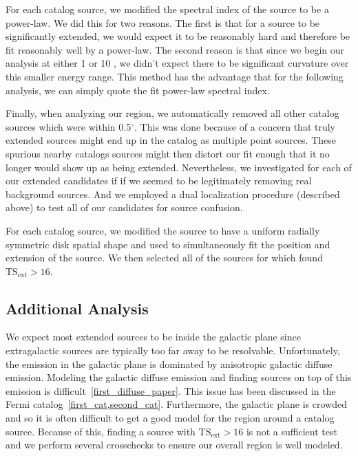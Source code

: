 \documentclass[12pt,preprint]{aastex}
\newcommand{\gev}{\text{GeV}\xspace}
\newcommand{\tsext}{{\ensuremath{\text{TS}_\text{ext}}}\xspace}
\renewcommand{\deg}{\ensuremath{^\circ}\xspace}
\newcommand{\pointlike}{\text{\em pointlike}\xspace}
\begin{document}
For each catalog source, we modified the spectral index of the source
to be a power-law. We did this for two reasons. The first is that for a
source to be significantly extended, we would expect it to be reasonably
hard and therefore be fit reasonably well by a power-law.  The second reason
is that since we begin our analysis at either 1 \gev or 10 \gev, we didn't
expect there to be significant curvature over this smaller energy range.
This method has the advantage that for the following analysis, we can
simply quote the fit power-law spectral index.

Finally, when analyzing our region, we automatically removed all other
catalog sources which were within 0.5\deg. This was done because of
a concern that truly extended sources might end up in the catalog as
multiple point sources. These spurious nearby catalogs sources might then
distort our fit enough that it no longer would show up as being extended.
Nevertheless, we investigated for each of our extended candidates if
if we seemed to be legitimately removing real background sources. And
we employed a dual localization procedure (described above) to test
all of our candidates for source confusion.

For each catalog source, we modified the source to have a uniform radially
symmetric disk spatial shape and used \pointlike to simultaneously fit
the position and extension of the source.  We then selected all of the
sources for which \pointlike found $\tsext>16$.

\subsection{Additional Analysis}

We expect most extended sources to be inside the galactic plane
since extragalactic sources are typically too far away to be
resolvable. Unfortunately, the \gev emission in the galactic plane
is dominated by anisotropic galactic diffuse emission.  Modeling the
galactic diffuse emission and finding sources on top of this emission is
difficult~\ref{first_diffuse_paper}. This issue has been discussed in the
Fermi catalog~\ref{first_cat,second_cat}. Furthermore, the galactic plane is
crowded and so it is often difficult to get a good model for the
region around a catalog source.  Because of this, finding a source with
$\tsext>16$ is not a sufficient test and we perform several crosschecks
to ensure our overall region is well modeled.
\end{document}
